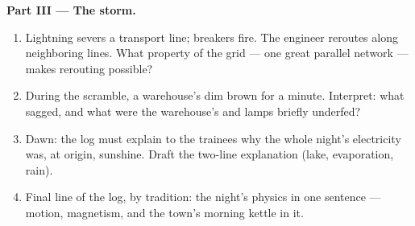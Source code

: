 \begin{problem}
\medskip\noindent\textbf{Part III --- The storm.}
\begin{enumerate}[resume]
  \item Lightning severs a transport line; breakers fire.
        The engineer reroutes  along neighboring
        lines. What property of the grid --- one great
        parallel network --- makes rerouting possible?
  \item During the scramble, a warehouse's  dim
        brown for a minute. Interpret: what sagged, and
        what were the warehouse's  and lamps briefly
        underfed?
  \item Dawn: the log must explain to the trainees why
        the whole night's electricity was, at origin,
        sunshine. Draft the two-line explanation (lake,
        evaporation, rain).
  \item Final line of the log, by tradition: the night's
        physics in one sentence --- motion, magnetism,
        and the town's morning kettle in it.
\end{enumerate}
\end{problem}
